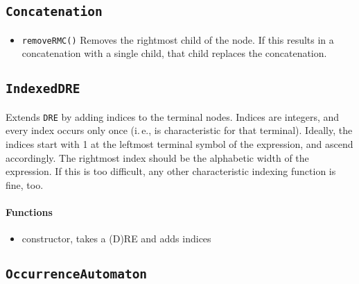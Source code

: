 \documentclass[a4paper,11pt, svgnames,titlepage]{article}
\begin{document}
\subsection{\texttt{Concatenation}}\label{sec:des:conc}
\begin{itemize}
	\item\texttt{removeRMC()} Removes the rightmost child of the node. If this results in a concatenation with a single child, that child replaces the concatenation.
\end{itemize}

\subsection{\texttt{IndexedDRE}}\label{sec:des:idre}
Extends \texttt{DRE} by adding indices to the terminal nodes. Indices are integers, and every index occurs only once (i.\,e., is characteristic for that terminal). Ideally, the indices start with 1 at the leftmost terminal symbol of the expression, and ascend accordingly. The rightmost index should be the alphabetic width of the expression. If this is too difficult, any other characteristic indexing function is fine, too.
\paragraph{Functions}
\begin{itemize}
	\item constructor, takes a (D)RE and adds indices
\end{itemize}

\subsection{\texttt{OccurrenceAutomaton}}\label{sec:des:oa}
\end{document}
